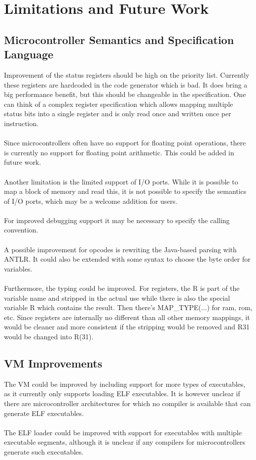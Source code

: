 \chapter{Limitations and Future Work}

\section{Microcontroller Semantics and Specification Language}
Improvement of the status registers should be high on the priority list.
Currently these registers are hardcoded in the code generator which is bad. It
does bring a big performance benefit, but this should be changeable in the
specification. One can think of a complex register specification which allows
mapping multiple status bits into a single register and is only read once and
written once per instruction.\\
\\
Since microcontrollers often have no support for floating point operations,
there is currently no support for floating point arithmetic. This could be
added in future work.\\
\\
Another limitation is the limited support of I/O ports. While it is possible to
map a block of memory and read this, it is not possible to specify the
semantics of I/O ports, which may be a welcome addition for users.\\
\\
For improved debugging support it may be necessary to specify the calling
convention.\\
\\
A possible improvement for opcodes is rewriting the Java-based parsing with
ANTLR. It could also be extended with some syntax to choose the byte order for
variables.\\
\\
Furthermore, the typing could be improved. For registers, the R is part of the
variable name and stripped in the actual use while there is also the special
variable R which contains the result. Then there's MAP\_TYPE(...) for ram, rom,
etc. Since registers are internally no different than all other memory
mappings, it would be cleaner and more consistent if the stripping would be
removed and R31 would be changed into R(31).

\section{VM Improvements}
The VM could be improved by including support for more types of executables, as
it currently only supports loading ELF executables. It is however unclear if there are
microcontroller architectures for which no compiler is available that can
generate ELF executables.\\
\\
The ELF loader could be improved with support for executables with multiple 
executable segments, although it is unclear if any compilers for microcontrollers
generate such executables.

